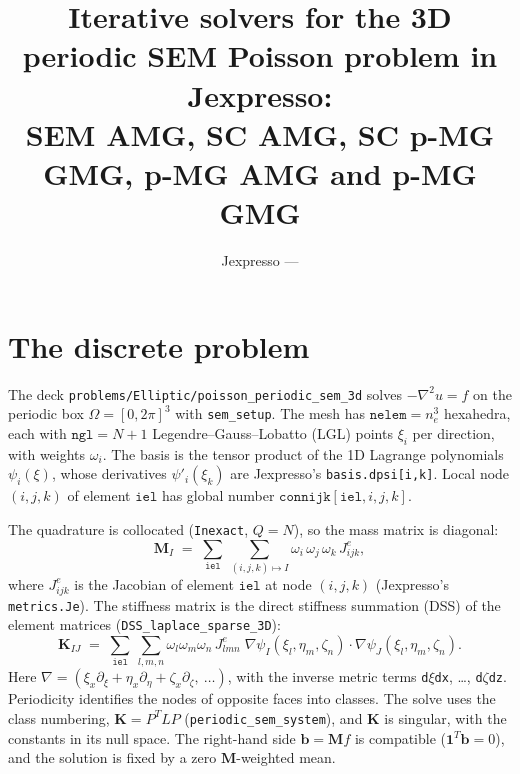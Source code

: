 \documentclass[11pt]{article}
\title{\vspace{-2.5em}Iterative solvers for the 3D periodic SEM Poisson problem in Jexpresso:\\
SEM AMG, SC AMG, SC p-MG GMG, p-MG AMG and p-MG GMG}
\author{Jexpresso --- \code{sm/elementLearning}}
\date{}
\newcommand{\ngl}{\mathtt{ngl}}
\newcommand{\nelem}{\mathtt{nelem}}
\newcommand{\iel}{\mathtt{iel}}
\newcommand{\connijk}{\mathtt{connijk}}
\newcommand{\Je}{J^{e}}
\newcommand{\K}{\mathbf{K}}
\newcommand{\M}{\mathbf{M}}
\newcommand{\bb}{\mathbf{b}}
\newcommand{\code}[1]{\texttt{#1}}
\begin{document}
\maketitle
\vspace{-2.5em}

\section{The discrete problem}\label{sec:problem}

The deck \code{problems/Elliptic/poisson\_periodic\_sem\_3d} solves $-\nabla^2 u = f$ on the
periodic box $\Omega=[0,2\pi]^3$ with \code{sem\_setup}. The mesh has $\nelem = n_e^3$ hexahedra,
each with $\ngl = N+1$ Legendre--Gauss--Lobatto (LGL) points $\xi_i$ per direction, with weights $\omega_i$.
The basis is the tensor product of the 1D Lagrange polynomials $\psi_i(\xi)$, whose
derivatives $\psi'_i(\xi_k)$ are Jexpresso's \code{basis.dpsi[i,k]}. Local node $(i,j,k)$ of
element $\iel$ has global number $\connijk[\iel,i,j,k]$.

The quadrature is collocated (\code{Inexact}, $Q=N$), so the mass matrix is diagonal:
\begin{equation}
  \M_{I} \;=\; \sum_{\iel}\ \sum_{(i,j,k)\mapsto I} \omega_i\,\omega_j\,\omega_k\,\Je_{ijk},
  \label{eq:mass}
\end{equation}
where $\Je_{ijk}$ is the Jacobian of element $\iel$ at node $(i,j,k)$ (Jexpresso's \code{metrics.Je}). The
stiffness matrix is the direct stiffness summation (DSS) of the element matrices
(\code{DSS\_laplace\_sparse\_3D}):
\begin{equation}
  \K_{IJ} \;=\; \sum_{\iel}\ \sum_{l,m,n} \omega_l\omega_m\omega_n\,\Je_{lmn}\;
  \nabla\psi_I(\xi_l,\eta_m,\zeta_n)\cdot\nabla\psi_J(\xi_l,\eta_m,\zeta_n).
  \label{eq:stiff}
\end{equation}
Here $\nabla = (\xi_x\partial_\xi + \eta_x\partial_\eta + \zeta_x\partial_\zeta,\ \dots)$, with the
inverse metric terms \code{d$\xi$dx}, \dots, \code{d$\zeta$dz}. Periodicity identifies the nodes of
opposite faces into classes. The solve uses the class numbering, $\K = P^{T} L P$
(\code{periodic\_sem\_system}), and $\K$ is singular, with the constants in its null space.
The right-hand side $\bb = \M f$ is compatible ($\mathbf{1}^T\bb = 0$), and the solution is
fixed by a zero $\M$-weighted mean.
\end{document}
